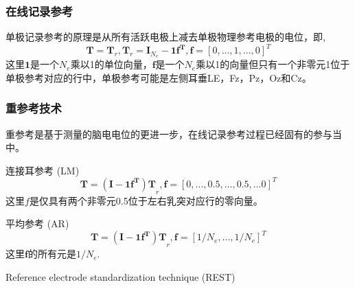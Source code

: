 \subsubsection{在线记录参考}
单极记录参考的原理是从所有活跃电极上减去单极物理参考电极的电位，即,
\begin{equation}\label{eq2.4}
\mathbf{T}=\mathbf{T}_{r},\mathbf{T}_{r}=\mathbf{I}_{N_{e}}-\mathbf{1f^T},\mathbf{f}=[0,...,1,...,0]^T
\end{equation}
这里$\mathbf{1}$是一个$N_{e}$乘以1的单位向量，$\mathbf{f}$是一个$N_e$乘以1的向量但只有一个非零元1位于单极参考对应的行中，单极参考可能是左侧耳垂LE，Fz，Pz，Oz和Cz。

\subsubsection{重参考技术}
重参考是基于测量的脑电电位的更进一步，在线记录参考过程已经固有的参与当中。

连接耳参考 (LM)
\begin{equation}\label{eq2.5}
\mathbf{T}=\mathbf{(I-1f^T)T}_{r},\mathbf{f}=[0,...,0.5,...,0.5,...0]^T
\end{equation}
这里$f$是仅具有两个非零元0.5位于左右乳突对应行的零向量。

平均参考 (AR)
\begin{equation}\label{eq2.6}
\mathbf{T}=\mathbf{(I-1f^T)T}_{r},\mathbf{f}=[1/{N_e},...,1/{N_e}]^T
\end{equation}
这里$\mathbf{f}$的所有元是$1/{N_e}$.

Reference electrode standardization technique (REST)

